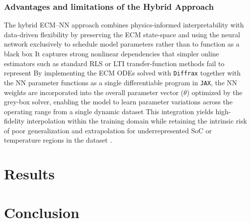 \documentclass[lettersize,journal]{IEEEtran}
\begin{document}
\subsubsection{Advantages and limitations of the Hybrid Approach}

The hybrid ECM–NN approach combines physics-informed interpretability with data-driven flexibility by preserving the ECM state-space and using the neural network exclusively to schedule model parameters rather than to function as a black box \cite{takyi2023narx, xia2024hybrid} It captures strong nonlinear dependencies that simpler online estimators such as standard RLS or LTI transfer-function methods fail to represent \cite{tran2021comprehensive, pai2023online} By implementing the ECM ODEs solved with \texttt{Diffrax} together with the NN parameter functions as a single differentiable program in \texttt{JAX}, the NN weights are incorporated into the overall parameter vector ($\theta$) optimized by the grey-box solver, enabling the model to learn parameter variations across the operating range from a single dynamic dataset This integration yields high-fidelity interpolation within the training domain while retaining the intrinsic risk of poor generalization and extrapolation for underrepresented SoC or temperature regions in the dataset \cite{valizadeh2024machine, kawahara2023battery}.
\section{Results}

\section{Conclusion}



\end{document}
